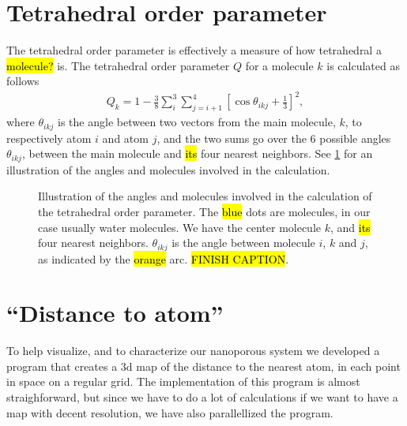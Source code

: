 \section{Tetrahedral order parameter}
The tetrahedral order parameter\cite{errington2001relationship} is effectively a measure of how tetrahedral a \hl{molecule?} is. The tetrahedral order parameter $Q$ for a molecule $k$ is calculated as follows
\begin{align*}
    Q_k = 1 - \frac{3}{8}\sum_i^3\sum_{j=i+1}^4 \left[ \cos \theta_{ikj} + \frac{1}{3} \right]^2,
\end{align*}
where $\theta_{ikj}$ is the angle between two vectors from the main molecule, $k$, to respectively atom $i$ and atom $j$, and the two sums go over the 6 possible angles $\theta_{ikj}$, between the main molecule and \hl{its} four nearest neighbors. See \cref{fig:top_tetrahedra} for an illustration of the angles and molecules involved in the calculation.
%
\begin{figure}[htpb]%
    \centering%
    \caption{%
        Illustration of the angles and molecules involved in the calculation of the tetrahedral order parameter. The \hl{blue} dots are molecules, in our case usually water molecules. We have the center molecule $k$, and \hl{its} four nearest neighbors. $\theta_{ikj}$ is the angle between molecule $i$, $k$ and $j$, as indicated by the \hl{orange} arc. \hl{FINISH CAPTION}. %
        \label{fig:top_tetrahedra}%
    }%
\end{figure}%

\section{``Distance to atom''\label{sec:distance_to_atom}}
To help visualize, and to characterize our nanoporous system we developed a program that creates a 3d map of the distance to the nearest atom, in each point in space on a regular grid. The implementation of this program is almost straighforward, but since we have to do a lot of calculations if we want to have a map with decent resolution, we have also parallellized the program. 

